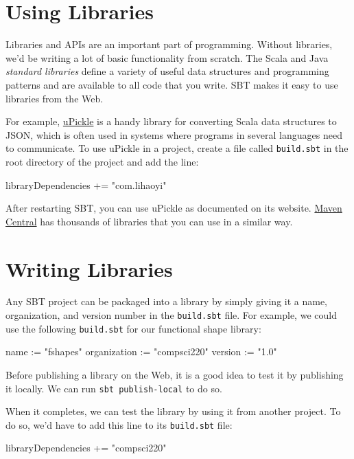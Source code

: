 \documentclass{book}
\begin{document}
\section{Using Libraries}

Libraries and APIs are an important part of programming. Without libraries,
we'd be writing a lot of basic functionality from scratch. The Scala
and Java \emph{standard libraries} define a variety of useful data structures
and programming patterns and are available to all code that you write.
SBT makes it easy to use libraries from the Web.

For example,
\href{https://lihaoyi.github.io/upickle-pprint/upickle/}{uPickle} is a
handy library for converting Scala data structures to JSON, which is
often used in systems where programs in several languages need to communicate.
To use uPickle in a project, create a file called \texttt{build.sbt} in the
root directory of the project and add the line:
%
\begin{scalacode}
libraryDependencies += "com.lihaoyi" %
\end{scalacode}
%
After restarting SBT, you can use uPickle as documented on its website.
\href{http://mvnrepository.com}{Maven Central} has thousands of libraries
that you can use in a similar way.

\section{Writing Libraries}

Any SBT project can be packaged into a library by simply giving it
a name, organization, and version number in the \texttt{build.sbt} file.
For example, we could use the following \texttt{build.sbt} for our
functional shape library:

\begin{scalacode}
name := "fshapes"
organization := "compsci220"
version := "1.0"
\end{scalacode}

Before publishing a library on the Web, it is a good idea to test it by
publishing it locally. We can run \texttt{sbt publish-local} to do so.

When it completes, we can test the library by using it from another
project. To do so, we'd have to add this line to its \texttt{build.sbt}
file:
\begin{scalacode}
libraryDependencies += "compsci220" %
\end{scalacode}
\end{document}
